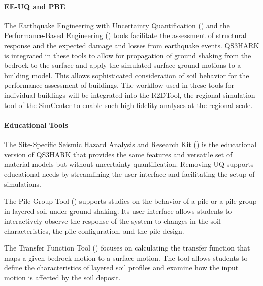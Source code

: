 \paragraph{EE-UQ and PBE} The Earthquake Engineering with Uncertainty Quantification () and the Performance-Based Engineering () tools facilitate the assessment of structural response and the expected damage and losses from earthquake events. QS3HARK is integrated in these tools to allow for propagation of ground shaking from the bedrock to the surface and apply the simulated surface ground motions to a building model. This allows sophisticated consideration of soil behavior for the performance assessment of buildings. The workflow used in these tools for individual buildings will be integrated into the R2DTool, the regional simulation tool of the SimCenter to enable such high-fidelity analyses at the regional scale.

\paragraph{Educational Tools} The Site-Specific Seismic Hazard Analysis and Research Kit () is the educational version of QS3HARK that provides the same features and versatile set of material models but without uncertainty quantification. Removing UQ supports educational needs by streamlining the user interface and facilitating the setup of simulations.

\noindent The Pile Group Tool () supports studies on the behavior of a pile or a pile-group in layered soil under ground shaking. Its user interface allows students to interactively observe the response of the system to changes in the soil characteristics, the pile configuration, and the pile design.

\noindent The Transfer Function Tool () focuses on calculating the transfer function that maps a given bedrock motion to a surface motion. The tool allows students to define the characteristics of layered soil profiles and examine how the input motion is affected by the soil deposit.
